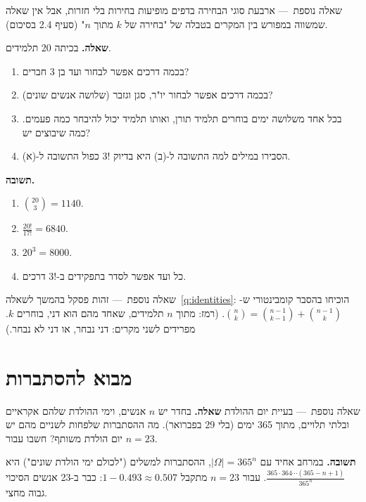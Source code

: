 \documentclass[11pt,a4paper]{report}
\newcommand{\dash}{{\rmfamily —}}
\begin{document}
\begin{suggestion}{שאלה נוספת~\dash{} ארבעת סוגי הבחירה}
בדפים מופיעות בחירות בלי חזרות, אבל אין שאלה שמשווה במפורש בין המקרים בטבלה של "בחירה של $k$ מתוך $n$" (סעיף 2.4 בסיכום).

\textbf{שאלה.} בכיתה 20 תלמידים.
\begin{enumerate}[label=(\alph*),itemsep=1pt,topsep=2pt]
  \item בכמה דרכים אפשר לבחור ועד בן 3 חברים?
  \item בכמה דרכים אפשר לבחור יו"ר, סגן וגזבר (שלושה אנשים שונים)?
  \item בכל אחד משלושה ימים בוחרים תלמיד תורן, ואותו תלמיד יכול להיבחר כמה פעמים. כמה שיבוצים יש?
  \item הסבירו במילים למה התשובה ל-(ב) היא בדיוק $3!$ כפול התשובה ל-(א).
\end{enumerate}
\textbf{תשובה.}
\begin{enumerate}[label=(\alph*),itemsep=1pt,topsep=2pt]
  \item $\binom{20}3=1140$.
  \item $\frac{20!}{17!}=6840$.
  \item $20^3=8000$.
  \item כל ועד אפשר לסדר בתפקידים ב-$3!$ דרכים.
\end{enumerate}
\end{suggestion}

\begin{suggestion}{שאלה נוספת~\dash{} זהות פסקל}
בהמשך לשאלה~\ref{q:identities}: הוכיחו בהסבר קומבינטורי ש-$\binom nk=\binom{n-1}{k-1}+\binom{n-1}k$.
(רמז: מתוך $n$ תלמידים, שאחד מהם הוא דני, בוחרים $k$. מפרידים לשני מקרים: דני נבחר, או דני לא נבחר.)
\end{suggestion}

\chapter{מבוא להסתברות}
\begin{suggestion}{שאלה נוספת~\dash{} בעיית יום ההולדת}
\textbf{שאלה.} בחדר יש $n$ אנשים, וימי ההולדת שלהם אקראיים ובלתי תלויים, מתוך 365 ימים (בלי 29 בפברואר). מה ההסתברות שלפחות לשניים מהם יש יום הולדת משותף? חשבו עבור $n=23$.

\textbf{תשובה.} במרחב אחיד עם $|\Omega|=365^n$, ההסתברות למשלים ("לכולם ימי הולדת שונים") היא $\frac{365\cdot364\cdots(365-n+1)}{365^n}$. עבור $n=23$ מתקבל $1-0.493\approx0.507$: כבר ב-23 אנשים הסיכוי גבוה מחצי.
\end{suggestion}
\end{document}
